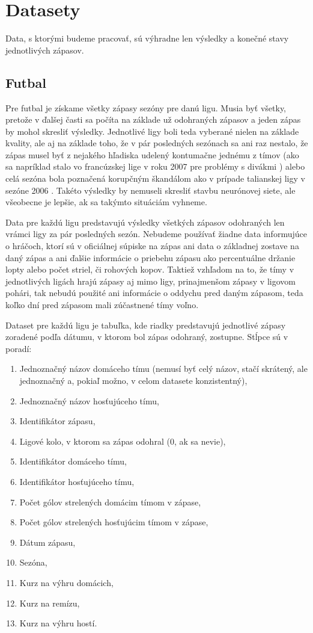 \chapter{Datasety}

Data, s ktorými budeme pracovať, sú výhradne len výsledky a konečné stavy jednotlivých zápasov. 

\section{Futbal} \label{foot}
Pre futbal je získame všetky zápasy sezóny pre danú ligu. 
Musia byť všetky, pretože v ďalšej časti sa počíta na základe už odohraných zápasov a jeden zápas by mohol skresliť výsledky. 
Jednotlivé ligy boli teda vyberané nielen na základe kvality, ale aj na základe toho, že v pár posledných sezónach sa ani raz nestalo, že zápas musel byť z nejakého hľadiska udelený kontumačne jednému z tímov (ako sa napríklad stalo vo francúzskej lige v roku 2007 pre problémy s divákmi \citep{awarded}) alebo celá sezóna bola poznačená korupčným škandálom ako v prípade talianskej ligy v sezóne 2006 \citep{scandal}.
Takéto výsledky by nemuseli skresliť stavbu neurónovej siete, ale všeobecne je lepšie, ak sa takýmto situáciám vyhneme.

Data pre každú ligu predstavujú výsledky všetkých zápasov odohraných len vrámci ligy za pár posledných sezón. 
Nebudeme používať žiadne data informujúce o hráčoch, ktorí sú v oficiálnej súpiske na zápas ani data o základnej zostave na daný zápas a ani ďalšie informácie o priebehu zápasu ako percentuálne držanie lopty alebo počet striel, či rohových kopov.
Taktiež vzhľadom na to, že tímy v jednotlivých ligách hrajú zápasy aj mimo ligy, prinajmenšom zápasy v ligovom pohári, tak nebudú použité ani informácie o oddychu pred daným zápasom, teda koľko dní pred zápasom mali zúčastnené tímy voľno.

Dataset pre každú ligu je tabuľka, kde riadky predstavujú jednotlivé zápasy zoradené podľa dátumu, v ktorom bol zápas odohraný, zostupne.
Stĺpce sú v poradí:
\begin{enumerate}
  \item Jednoznačný názov domáceho tímu (nemusí byť celý názov, stačí skrátený, ale jednoznačný a, pokiaľ možno, v celom datasete konzistentný),
  \item Jednoznačný názov hosťujúceho tímu,
  \item Identifikátor zápasu,
  \item Ligové kolo, v ktorom sa zápas odohral (0, ak sa nevie),
  \item Identifikátor domáceho tímu,
  \item Identifikátor hosťujúceho tímu,
  \item Počet gólov strelených domácim tímom v zápase,
  \item Počet gólov strelených hosťujúcim tímom v zápase,
  \item Dátum zápasu,
  \item Sezóna,
  \item Kurz na výhru domácich,
  \item Kurz na remízu,
  \item Kurz na výhru hostí.
\end{enumerate}

